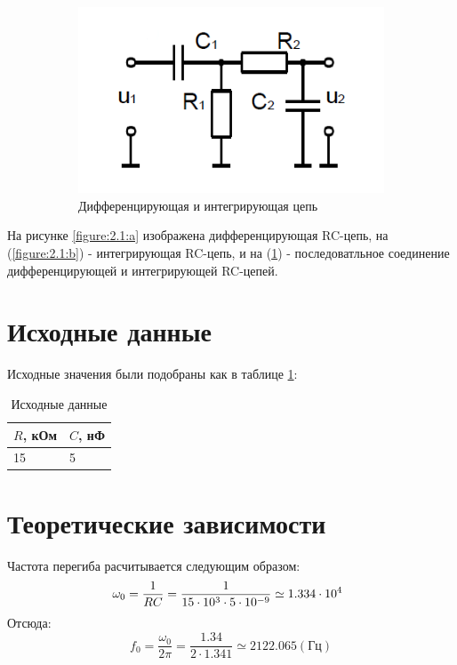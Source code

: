 \begin{figure}[h]
\begin{subfigure}[b]{0.3\textwidth}
\includegraphics[scale=0.4]{v_scheme.png}
\caption{Дифференцирующая и интегрирующая цепь}\label{figure:2.1:c}
\end{subfigure}
\caption{}\label{figure:2.1}
\end{figure}
На рисунке \ref{figure:2.1:a} изображена дифференцирующая RC-цепь, на (\ref{figure:2.1:b}) - интегрирующая RC-цепь, и на  (\ref{figure:2.1:c}) - последоватльное соединение дифференцирующей и интегрирующей RC-­цепей.


\section{Исходные данные}
Исходные значения были подобраны как в таблице \ref{tabular:11}:

\begin{table}[H]
	\begin{center}
	\caption{Исходные данные}
	\def\arraystretch{1.5}
		\begin{tabularx}{\textwidth}{|X|X|}
			\hline
			$R$, кОм & $C$, нФ\\\hline
		     15 & 5\\\hline	
		\end{tabularx}
		\label{tabular:11}
	\end{center}
\end{table}

\section{Теоретические зависимости}
Частота перегиба расчитывается следующим образом:
\begin{equation}
\omega_0 = \frac{1}{RC} = \frac{1}{15 \cdot 10^3 \cdot 5 \cdot 10^{-9}} \simeq 1.334 \cdot 10^4 \hspace*{2mm}
\end{equation}
Отсюда: 
\begin{equation}
f_0 = \frac{\omega_0}{2 \pi} = \frac{1.34}{2\cdot1.341} \simeq 2122.065 (\text{Гц})
\end{equation}

